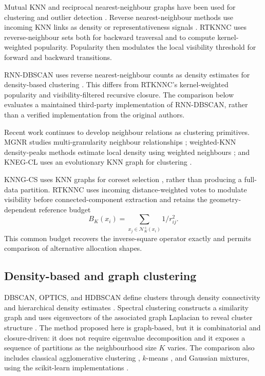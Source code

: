 \documentclass[pdflatex,sn-basic,Numbered]{sn-jnl}
\newcommand{\calN}{\mathcal{N}}
\begin{document}
Mutual KNN and reciprocal nearest-neighbour graphs have been used for clustering and outlier detection \citep{BritoChavezQuirozYukich1997,GowdaKrishna1978,SardanaBhatnagar2014}. Reverse nearest-neighbour methods use incoming KNN links as density or representativeness signals \citep{ChowdhuryAmorim2018}. RTKNNC uses reverse-neighbour sets both for backward traversal and to compute kernel-weighted popularity. Popularity then modulates the local visibility threshold for forward and backward transitions.

RNN-DBSCAN uses reverse nearest-neighbour counts as density estimates for
density-based clustering \citep{BryantCios2018RNNDBSCAN}. This differs from
RTKNNC's kernel-weighted popularity and visibility-filtered recursive closure.
The comparison below evaluates a maintained third-party implementation of
RNN-DBSCAN, rather than a verified implementation from the original authors.

Recent work continues to develop neighbour relations as clustering primitives.
MGNR studies multi-granularity neighbour relationships
\citep{XieEtAl2024MGNR}; weighted-KNN density-peaks methods estimate local
density using weighted neighbours \citep{DingEtAl2024WeightedKNN}; and
KNEG-CL uses an evolutionary KNN graph for clustering
\citep{FeiEtAl2025KNEGCL}.

KNNG-CS uses KNN graphs for coreset selection
\citep{LiuEtAl2026KNNGCS}, rather than producing a full-data partition.
RTKNNC uses incoming distance-weighted votes to modulate visibility before
connected-component extraction and retains the geometry-dependent reference budget
\[
B_K(x_i)=\sum_{x_j\in\calN_K^+(x_i)}1/r_{ij}^2.
\] This common budget recovers the inverse-square operator exactly and permits comparison of alternative allocation shapes.

\subsection{Density-based and graph clustering}

DBSCAN, OPTICS, and HDBSCAN define clusters through density connectivity and hierarchical density estimates \citep{Ester1996DBSCAN,Ankerst1999OPTICS,Campello2013HDBSCAN,CampelloMoulaviZimekSander2015}. Spectral clustering constructs a similarity graph and uses eigenvectors of the associated graph Laplacian to reveal cluster structure \citep{NgJordanWeiss2002,VonLuxburg2007}. The method proposed here is graph-based, but it is combinatorial and closure-driven: it does not require eigenvalue decomposition and it exposes a sequence of partitions as the neighbourhood size $K$ varies.
The comparison also includes classical agglomerative clustering
\citep{MurtaghContreras2012}, $k$-means \citep{Lloyd1982,MacQueen1967}, and
Gaussian mixtures, using the scikit-learn implementations
\citep{PedregosaEtAl2011}.
\end{document}
